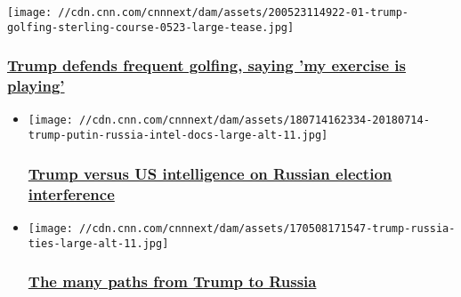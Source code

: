 \begin{itemize}
  \texttt{[image: //cdn.cnn.com/cnnnext/dam/assets/200523114922-01-trump-golfing-sterling-course-0523-large-tease.jpg]}

  \hypertarget{trump-defends-frequent-golfing-saying-my-exercise-is-playing-}{%
  \subsubsection{\texorpdfstring{\href{/2020/07/12/politics/trump-exercise-golf/index.html}{Trump
  defends frequent golfing, saying 'my exercise is playing'
  }}{Trump defends frequent golfing, saying 'my exercise is playing' }}\label{trump-defends-frequent-golfing-saying-my-exercise-is-playing-}}
\end{itemize}

\begin{itemize}
\item
  \href{https://cnn.it/2JzurYu}{}

  \texttt{[image: //cdn.cnn.com/cnnnext/dam/assets/180714162334-20180714-trump-putin-russia-intel-docs-large-alt-11.jpg]}

  \hypertarget{trump-versus-us-intelligence-on-russian-election-interference}{%
  \subsubsection{\texorpdfstring{\href{https://cnn.it/2JzurYu}{Trump
  versus US intelligence on Russian election
  interference}}{Trump versus US intelligence on Russian election interference}}\label{trump-versus-us-intelligence-on-russian-election-interference}}
\item
  \href{http://cnn.it/2qiTqu2}{}

  \texttt{[image: //cdn.cnn.com/cnnnext/dam/assets/170508171547-trump-russia-ties-large-alt-11.jpg]}

  \hypertarget{the-many-paths-from-trump-to-russia}{%
  \subsubsection{\texorpdfstring{\href{http://cnn.it/2qiTqu2}{The many
  paths from Trump to
  Russia}}{The many paths from Trump to Russia}}\label{the-many-paths-from-trump-to-russia}}
\end{itemize}

